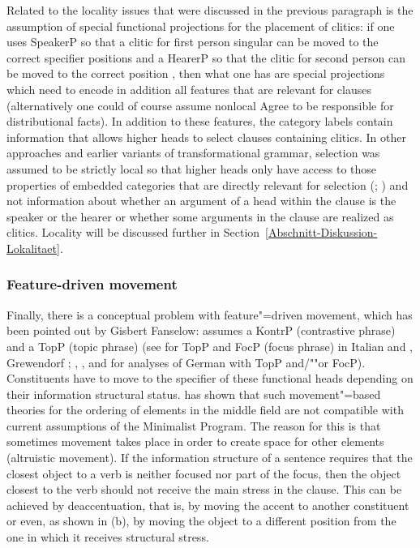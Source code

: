 Related to the locality issues that were discussed in the previous paragraph is the assumption of
special functional projections for the placement of clitics: if one uses
SpeakerP so that a clitic for first person singular can be moved to
the correct specifier positions and a HearerP so that the clitic for
second person can be moved to the correct position \citep[]{Poletto2000a-u}, then what one
has are special projections which need to encode in addition all features that are relevant for
clauses (alternatively one could of course assume nonlocal Agree to be responsible for distributional facts). In
addition to these features, the category labels contain information that allows higher heads to select clauses
containing clitics. In other approaches and earlier variants of transformational grammar, selection
was assumed to be strictly local so that higher heads only have access to those
properties of embedded categories that are directly relevant for selection (\citealp[]{Abraham2005a}; \citealp{Sag2007a}) and not information about whether an argument of a head within the clause is
the speaker or the hearer or whether some arguments in the clause are realized as clitics. Locality
will be discussed further in Section~\ref{Abschnitt-Diskussion-Lokalitaet}.

\subsubsection{Feature-driven movement}
\label{sec-feature-driven-movement}

Finally, there is a conceptual problem with feature"=driven movement, which has been pointed out by Gisbert Fanselow:
\mbox{}\citet[]{Frey2004a} assumes a KontrP 
(contrastive phrase) and \citet{Frey2004b-u} a TopP (topic phrase) (see  for TopP and
FocP (focus phrase) in Italian and  
, Grewendorf \citeyearpar[, 240]{Grewendorf2002a}; \citeyear{Grewendorf2009a},
,  and  for analyses of German with TopP and/""or FocP). 
Constituents have to move to the specifier of these functional heads depending on their information structural status. \citet{Fanselow2003b} has
shown that such movement"=based theories for the ordering of elements in the middle field are not compatible with current assumptions of the 
Minimalist Program\indexmp. The reason for this is that sometimes movement takes place in order to create space for other elements (altruistic 
movement).
If the information structure of a sentence requires that the closest object to a verb is neither
focused nor part of the focus, then the object closest to the verb should not
receive the main stress in the clause. This can be achieved by deaccentuation, that is, by moving
the accent to another constituent or even, as shown in (b), by moving the object to a different position from the one in which it receives structural stress.

